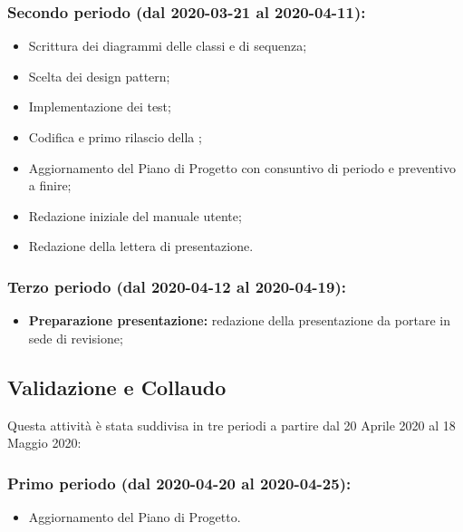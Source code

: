 		\subsubsection{Secondo periodo (dal 2020-03-21 al 2020-04-11):}
			\begin{itemize}
				\item Scrittura dei diagrammi delle classi e di sequenza;
				\item Scelta dei design pattern;
				\item Implementazione dei test;
				\item Codifica e primo rilascio della ;
				\item Aggiornamento del Piano di Progetto con consuntivo di periodo e preventivo a finire;
				\item Redazione iniziale del manuale utente;
				\item Redazione della lettera di presentazione.
			\end{itemize}

		\subsubsection{Terzo periodo (dal 2020-04-12 al 2020-04-19):}
			\begin{itemize}
				\item \textbf{Preparazione presentazione:} redazione della presentazione da portare in sede di revisione;
			\end{itemize}
	
	\subsection{Validazione e Collaudo}		
	Questa attività è stata suddivisa in tre periodi a partire dal 20 Aprile 2020 al 18 Maggio 2020:

		\subsubsection{Primo periodo (dal 2020-04-20 al 2020-04-25):}
			\begin{itemize}
			 	\item Aggiornamento del Piano di Progetto.
			\end{itemize} 	
		
